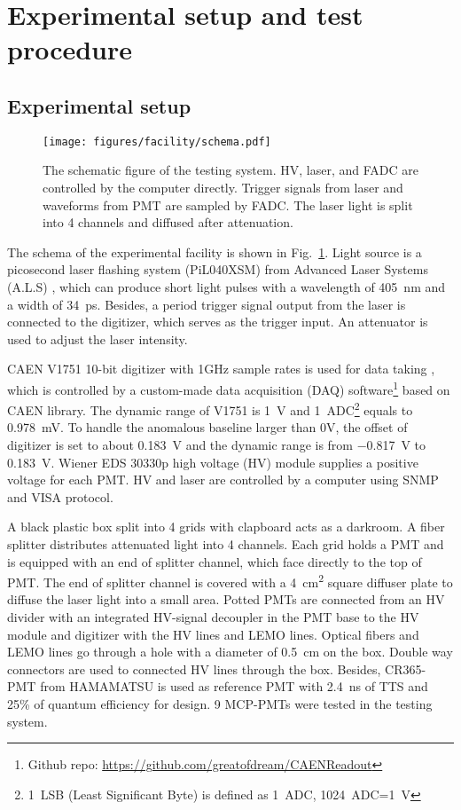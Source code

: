 \section{Experimental setup and test procedure}
\label{SetUp}
\subsection{Experimental setup}
\label{sec:setup}
\begin{figure}[!htbp]
    \centering
    \texttt{[image: figures/facility/schema.pdf]}
    \caption{The schematic figure of the testing system. HV, laser, and FADC are controlled by the computer directly. Trigger signals from laser and waveforms from PMT are sampled by FADC. The laser light is split into 4 channels and diffused after attenuation.}
    \label{fig:facility}
\end{figure}

The schema of the experimental facility is shown in Fig.~\ref{fig:facility}. Light source is a picosecond laser flashing system (PiL040XSM) from Advanced Laser Systems (A.L.S) \cite{NTKLaser}, which can produce short light pulses with a wavelength of \SI{405}{nm} and a width of \SI{34}{ps}. Besides, a period trigger signal output from the laser is connected to the digitizer, which serves as the trigger input. An attenuator is used to adjust the laser intensity.

CAEN V1751 10-bit digitizer with 1GHz sample rates is used for data taking \cite{CAENV1751}, which is controlled by a custom-made data acquisition (DAQ) software\footnote{Github repo: \url{https://github.com/greatofdream/CAENReadout}} based on CAEN library. The dynamic range of V1751 is \SI{1}{V} and \SI{1}{ADC}\footnote{\SI{1}{LSB} (Least Significant Byte) is defined as \SI{1}{ADC}, \SI{1024}{ADC}=\SI{1}{V}} equals to \SI{0.978}{mV}. To handle the anomalous baseline larger than 0V, the offset of digitizer is set to about \SI{0.183}{V} and the dynamic range is from \SI{-0.817}{V} to \SI{0.183}{V}. Wiener EDS 30330p high voltage (HV) module \cite{WIENERHV} supplies a positive voltage for each PMT. HV and laser are controlled by a computer using SNMP \cite{SNMP} and VISA \cite{VISA} protocol.

A black plastic box split into 4 grids with clapboard acts as a darkroom. A fiber splitter %
distributes attenuated light into 4 channels. Each grid holds a PMT and is equipped with an end of splitter channel, which face directly to the top of PMT. The end of splitter channel is covered with a \SI{4}{cm\tothe{2}} square diffuser plate to diffuse the laser light into a small area. Potted PMTs are connected from an HV divider with an integrated HV-signal decoupler in the PMT base to the HV module and digitizer with the HV lines and LEMO lines. Optical fibers and LEMO lines go through a hole with a diameter of \SI{0.5}{cm} on the box. Double way connectors are used to connected HV lines through the box. Besides, CR365-PMT \cite{BJBS} from HAMAMATSU is used as reference PMT with \SI{2.4}{ns} of TTS and 25\% of quantum efficiency for design.%
 9 MCP-PMTs were tested in the testing system.
